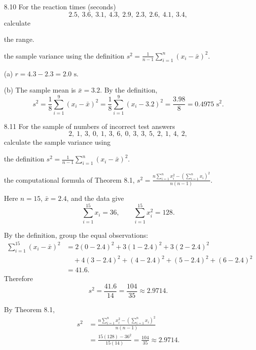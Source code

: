 \documentclass[11pt,oneside]{article}
\begin{document}
\begin{exercise}{8.10}
For the reaction times (seconds)
\[
2.5, \ 3.6, \ 3.1, \ 4.3, \ 2.9, \ 2.3, \ 2.6, \ 4.1, \ 3.4,
\]
calculate
\begin{exercisesubparts}
\item the range.
\item the sample variance using the definition $\displaystyle s^2=\frac{1}{n-1}\sum_{i=1}^{n}(x_i-\bar x)^2$.
\end{exercisesubparts}
\end{exercise}
\begin{solution}
\noindent\textup{(a)} $\boxed{r=4.3-2.3=2.0\text{ s}}$.


\noindent\textup{(b)} The sample mean is $\bar x=3.2$. By the definition,
\[
s^2=\frac18\sum_{i=1}^9(x_i-\bar x)^2
=\frac18\sum_{i=1}^9(x_i-3.2)^2
=\frac{3.98}{8}=\boxed{0.4975\text{ s}^2}.
\]
\end{solution}

\begin{exercise}{8.11}
For the sample of numbers of incorrect test answers
\[
2, \ 1, \ 3, \ 0, \ 1, \ 3, \ 6, \ 0, \ 3, \ 3, \ 5, \ 2, \ 1, \ 4, \ 2,
\]
calculate the sample variance using
\begin{exercisesubparts}
\item the definition $\displaystyle s^2=\frac{1}{n-1}\sum_{i=1}^{n}(x_i-\bar x)^2$.
\item the computational formula of Theorem 8.1, $\displaystyle s^2=\frac{n\sum_{i=1}^{n}x_i^2-(\sum_{i=1}^{n}x_i)^2}{n(n-1)}$.
\end{exercisesubparts}
\end{exercise}
\begin{solution}
Here $n=15$, $\bar x=2.4$, and the data give
\[
\sum_{i=1}^{15}x_i=36, \qquad \sum_{i=1}^{15}x_i^2=128.
\]
\begin{exercisesubparts}
\item By the definition, group the equal observations:
\[
\begin{aligned}
\sum_{i=1}^{15}(x_i-\bar x)^2
&=2(0-2.4)^2+3(1-2.4)^2+3(2-2.4)^2\\
&\quad+4(3-2.4)^2+(4-2.4)^2+(5-2.4)^2+(6-2.4)^2\\
&=41.6.
\end{aligned}
\]
Therefore
\[
s^2=\frac{41.6}{14}=\boxed{\frac{104}{35}\approx2.9714}.
\]
\item By Theorem 8.1,
\[
\begin{aligned}
s^2&=\frac{n\sum_{i=1}^n x_i^2-(\sum_{i=1}^n x_i)^2}{n(n-1)}\\
&=\frac{15(128)-36^2}{15(14)}
=\boxed{\frac{104}{35}\approx2.9714}.
\end{aligned}
\]
\end{exercisesubparts}
\end{solution}
\end{document}
